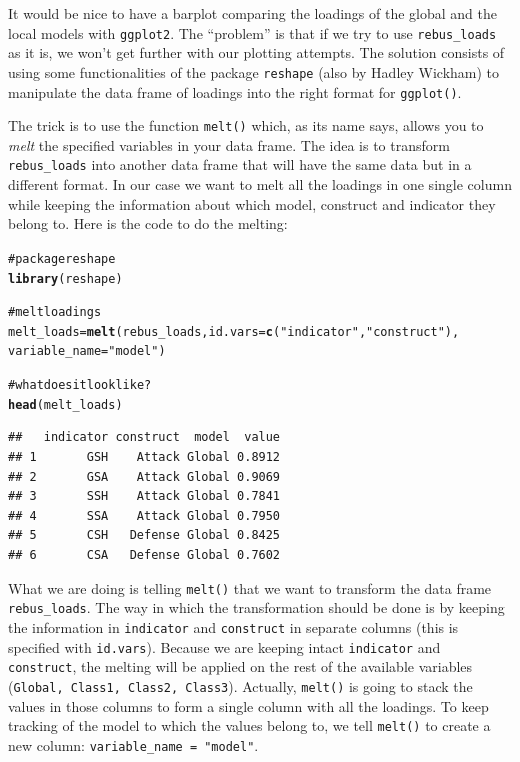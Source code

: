 \documentclass[12pt]{book}\usepackage{graphicx, color}
\makeatletter
\newcommand{\hlfunctioncall}[1]{\textcolor[rgb]{0.501960784313725,0,0.329411764705882}{\textbf{#1}}}%
\newcommand{\hlstring}[1]{\textcolor[rgb]{0.6,0.6,1}{#1}}%
\newcommand{\hlcomment}[1]{\textcolor[rgb]{0.180392156862745,0.6,0.341176470588235}{#1}}%
\newenvironment{kframe}{%
 \def\at@end@of@kframe{}%
 \ifinner\ifhmode%
  \def\at@end@of@kframe{\end{minipage}}%
  \begin{minipage}{\columnwidth}%
 \fi\fi%
 \def\FrameCommand##1{\hskip\@totalleftmargin \hskip-\fboxsep
 \colorbox{shadecolor}{##1}\hskip-\fboxsep
     \hskip-\linewidth \hskip-\@totalleftmargin \hskip\columnwidth}%
 \MakeFramed {\advance\hsize-\width
   \@totalleftmargin\z@ \linewidth\hsize
   \@setminipage}}%
 {\par\unskip\endMakeFramed%
 \at@end@of@kframe}
\newenvironment{knitrout}{}{} %
\newcommand{\code}[1]{\texttt{#1}}
\makeatother
\begin{document}
It would be nice to have a barplot comparing the loadings of the global and the local models with \code{ggplot2}. The ``problem'' is that if we try to use \code{rebus\_loads} as it is, we won't get further with our plotting attempts. The solution consists of using some functionalities of the package \code{reshape} (also by Hadley Wickham) to manipulate the data frame of loadings into the right format for \code{ggplot()}. 

The trick is to use the function \code{melt()} which, as its name says, allows you to \textit{melt} the specified variables in your data frame. The idea is to transform \code{rebus\_loads} into another data frame that will have the same data but in a different format. In our case we want to melt all the loadings in one single column while keeping the information about which model, construct and indicator they belong to. Here is the code to do the melting:
\begin{knitrout}
\color{fgcolor}\begin{kframe}
\begin{alltt}
\hlcomment{# package reshape}
\hlfunctioncall{library}(reshape)

\hlcomment{# melt loadings}
melt_loads = \hlfunctioncall{melt}(rebus_loads, id.vars = \hlfunctioncall{c}(\hlstring{"indicator"}, \hlstring{"construct"}), 
                  variable_name = \hlstring{"model"})

\hlcomment{# what does it look like?}
\hlfunctioncall{head}(melt_loads)
\end{alltt}
\begin{verbatim}
##   indicator construct  model  value
## 1       GSH    Attack Global 0.8912
## 2       GSA    Attack Global 0.9069
## 3       SSH    Attack Global 0.7841
## 4       SSA    Attack Global 0.7950
## 5       CSH   Defense Global 0.8425
## 6       CSA   Defense Global 0.7602
\end{verbatim}
\end{kframe}
\end{knitrout}

What we are doing is telling \code{melt()} that we want to transform the data frame \code{rebus\_loads}. The way in which the transformation should be done is by keeping the information in \code{indicator} and \code{construct} in separate columns (this is specified with \code{id.vars}). Because we are keeping intact \code{indicator} and \code{construct}, the melting will be applied on the rest of the available variables (\code{Global, Class1, Class2, Class3}). Actually, \code{melt()} is going to stack the values in those columns to form a single column with all the loadings. To keep tracking of the model to which the values belong to, we tell \code{melt()} to create a new column: \code{variable\_name = "model"}.
\end{document}

